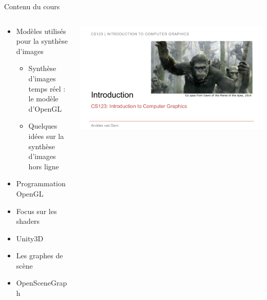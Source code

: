 
\begin{frame}{Contenu du cours}
\begin{columns}
\begin{column}{0.6\textwidth}
\begin{itemize}
\item Modèles utilisés pour la synthèse d'images
\begin{itemize}
\item Synthèse d'images temps réel : le modèle d'OpenGL
\item Quelques idées sur la synthèse d'images hors ligne
\end{itemize}
\item Programmation OpenGL
\item Focus sur les shaders
\item Unity3D
\item Les graphes de scène
\item OpenSceneGraph
\end{itemize}
\end{column}
\begin{column}{0.39\textwidth}
\begin{center}
\includegraphics[width=\textwidth]{figs/apes.pdf}
\end{center}
\end{column}
\end{columns}
\end{frame}

